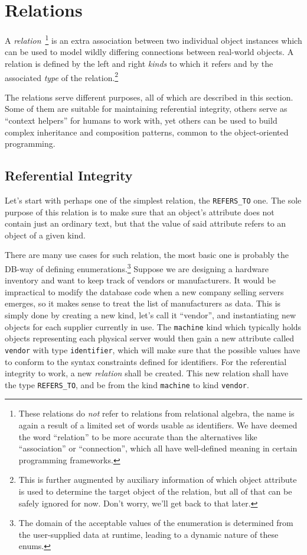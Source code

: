 \documentclass[deska]{subfiles}
\begin{document}
\section{Relations}
\label{sec:objects-and-relations-relations}

A {\em relation}~\footnote{These relations do {\em not} refer to relations from relational algebra, the name is again a
result of a limited set of words usable as identifiers.  We have deemed the word ``relation'' to be more accurate than
the alternatives like ``association'' or ``connection'', which all have well-defined meaning in certain programming
frameworks.} is an extra association between two individual object instances which can be used to model wildly differing
connections between real-world objects.  A relation is defined by the left and right {\em kinds} to which it refers and
by the associated {\em type} of the relation.\footnote{This is further augmented by auxiliary information of which
object attribute is used to determine the target object of the relation, but all of that can be safely ignored for now.
Don't worry, we'll get back to that later.}

The relations serve different purposes, all of which are described in this section.  Some of them are suitable for
maintaining referential integrity, others serve as ``context helpers'' for humans to work with, yet others can be used
to build complex inheritance and composition patterns, common to the object-oriented programming.

\subsection{Referential Integrity}

Let's start with perhaps one of the simplest relation, the {\tt REFERS\_TO} one.  The sole purpose of this relation is
to make sure that an object's attribute does not contain just an ordinary text, but that the value of said attribute
refers to an object of a given kind.

There are many use cases for such relation, the most basic one is probably the DB-way of defining
enumerations.\footnote{The domain of the acceptable values of the enumeration is determined from the user-supplied data
at runtime, leading to a dynamic nature of these enums.} Suppose
we are designing a hardware inventory and want to keep track of vendors or manufacturers.  It would be impractical to
modify the database code when a new company selling servers emerges, so it makes sense to treat the list of
manufacturers as data.  This is simply done by creating a new kind, let's call it ``vendor'', and instantiating new
objects for each supplier currently in use.  The {\tt machine} kind which typically holds objects representing each
physical server would then gain a new attribute called {\tt vendor} with type {\tt identifier}, which will make sure
that the possible values have to conform to the syntax constraints defined for identifiers.  For the referential
integrity to work, a new {\em relation} shall be created.  This new relation shall have the type {\tt REFERS\_TO}, and
be from the kind {\tt machine} to kind {\tt vendor}.
\end{document}
